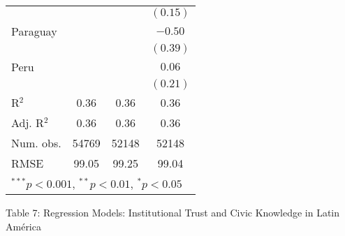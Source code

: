 \documentclass{article}
\begin{document}
\begin{table}[h!]
\begin{center}
\begin{tabular}{l c c c }
                     &               &               & $(0.15)$      \\
Paraguay             &               &               & $-0.50$       \\
                     &               &               & $(0.39)$      \\
Peru                 &               &               & $0.06$        \\
                     &               &               & $(0.21)$      \\
\hline
R$^2$                & 0.36          & 0.36          & 0.36          \\
Adj. R$^2$           & 0.36          & 0.36          & 0.36          \\
Num. obs.            & 54769         & 52148         & 52148         \\
RMSE                 & 99.05         & 99.25         & 99.04         \\
\hline
\multicolumn{4}{l}{\scriptsize{$^{***}p<0.001$, $^{**}p<0.01$, $^*p<0.05$}}
\end{tabular}
\label{tab6}
\end{center}
\end{table}

\break
\begin{center} 
Table 7: Regression Models: Institutional Trust and Civic Knowledge in Latin América
\end{center}
\end{document}
